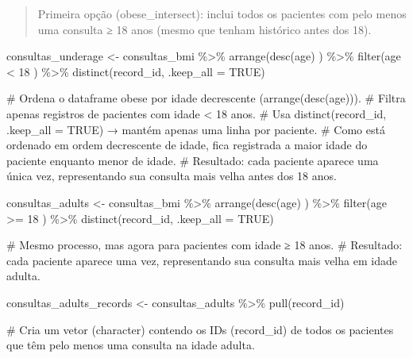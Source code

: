 \documentclass[
]{article}
\newenvironment{Shaded}{\begin{snugshade}}{\end{snugshade}}
\newcommand{\AttributeTok}[1]{\textcolor[rgb]{0.40,0.45,0.13}{#1}}
\newcommand{\CommentTok}[1]{\textcolor[rgb]{0.37,0.37,0.37}{#1}}
\newcommand{\ConstantTok}[1]{\textcolor[rgb]{0.56,0.35,0.01}{#1}}
\newcommand{\DecValTok}[1]{\textcolor[rgb]{0.68,0.00,0.00}{#1}}
\newcommand{\FunctionTok}[1]{\textcolor[rgb]{0.28,0.35,0.67}{#1}}
\newcommand{\NormalTok}[1]{\textcolor[rgb]{0.00,0.23,0.31}{#1}}
\newcommand{\OtherTok}[1]{\textcolor[rgb]{0.00,0.23,0.31}{#1}}
\newcommand{\SpecialCharTok}[1]{\textcolor[rgb]{0.37,0.37,0.37}{#1}}
\begin{document}
\begin{quote}
Primeira opção (obese\_intersect): inclui todos os pacientes com pelo
menos uma consulta ≥ 18 anos (mesmo que tenham histórico antes dos 18).
\end{quote}

\begin{Shaded}
\begin{Highlighting}[]
\NormalTok{consultas\_underage }\OtherTok{\textless{}{-}}\NormalTok{ consultas\_bmi }\SpecialCharTok{\%\textgreater{}\%} 
  \FunctionTok{arrange}\NormalTok{(}\FunctionTok{desc}\NormalTok{(age)}
\NormalTok{    ) }\SpecialCharTok{\%\textgreater{}\%} 
    \FunctionTok{filter}\NormalTok{(age }\SpecialCharTok{\textless{}} \DecValTok{18}
\NormalTok{    ) }\SpecialCharTok{\%\textgreater{}\%} 
  \FunctionTok{distinct}\NormalTok{(record\_id, }\AttributeTok{.keep\_all =} \ConstantTok{TRUE}\NormalTok{)}

\CommentTok{\#   Ordena o dataframe obese por idade decrescente (arrange(desc(age))).}
\CommentTok{\# Filtra apenas registros de pacientes com idade \textless{} 18 anos.}
\CommentTok{\# Usa distinct(record\_id, .keep\_all = TRUE) → mantém apenas uma linha por paciente.}
\CommentTok{\# Como está ordenado em ordem decrescente de idade, fica registrada a maior idade do paciente enquanto menor de idade.}
\CommentTok{\# Resultado: cada paciente aparece uma única vez, representando sua consulta mais velha antes dos 18 anos.}

\NormalTok{consultas\_adults }\OtherTok{\textless{}{-}}\NormalTok{ consultas\_bmi }\SpecialCharTok{\%\textgreater{}\%} 
    \FunctionTok{arrange}\NormalTok{(}\FunctionTok{desc}\NormalTok{(age)}
\NormalTok{            ) }\SpecialCharTok{\%\textgreater{}\%}
    \FunctionTok{filter}\NormalTok{(age }\SpecialCharTok{\textgreater{}=} \DecValTok{18}
\NormalTok{           ) }\SpecialCharTok{\%\textgreater{}\%} 
  \FunctionTok{distinct}\NormalTok{(record\_id, }\AttributeTok{.keep\_all =} \ConstantTok{TRUE}\NormalTok{)}

\CommentTok{\#   Mesmo processo, mas agora para pacientes com idade ≥ 18 anos.}
\CommentTok{\# Resultado: cada paciente aparece uma vez, representando sua consulta mais velha em idade adulta.}

\NormalTok{consultas\_adults\_records }\OtherTok{\textless{}{-}}\NormalTok{ consultas\_adults }\SpecialCharTok{\%\textgreater{}\%} \FunctionTok{pull}\NormalTok{(record\_id)}

\CommentTok{\# Cria um vetor (character) contendo os IDs (record\_id) de todos os pacientes que têm pelo menos uma consulta na idade adulta.}


\end{Highlighting}
\end{Shaded}
\end{document}
